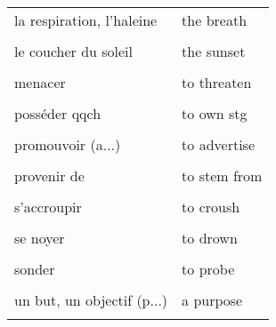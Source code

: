 \documentclass[
  10pt,
]{article}
\begin{document}
\begin{longtable}{ll}
la respiration, l'haleine & the breath\\

\cellcolor{gray!6}{le confinement} & \cellcolor{gray!6}{the lockdown}\\

le coucher du soleil & the sunset\\

\cellcolor{gray!6}{le sein maternel} & \cellcolor{gray!6}{the bosom}\\

menacer & to threaten\\

\cellcolor{gray!6}{pendant que} & \cellcolor{gray!6}{while}\\

posséder qqch & to own stg\\

\cellcolor{gray!6}{postuler à qqch} & \cellcolor{gray!6}{to apply for stg}\\

promouvoir (a...) & to advertise\\

\cellcolor{gray!6}{promouvoir (p...)} & \cellcolor{gray!6}{to promote}\\

provenir de & to stem from\\

\cellcolor{gray!6}{résoudre} & \cellcolor{gray!6}{to work out}\\

s'accroupir & to croush\\

\cellcolor{gray!6}{selon, d'après} & \cellcolor{gray!6}{according to}\\

se noyer & to drown\\

\cellcolor{gray!6}{(se) terminer} & \cellcolor{gray!6}{to be over}\\

sonder & to probe\\

\cellcolor{gray!6}{un but, un objectif (a...)} & \cellcolor{gray!6}{an aim}\\

un but, un objectif (p...) & a purpose\\

\cellcolor{gray!6}{un contour} & \cellcolor{gray!6}{an outline}\\


\end{longtable}
\end{document}

